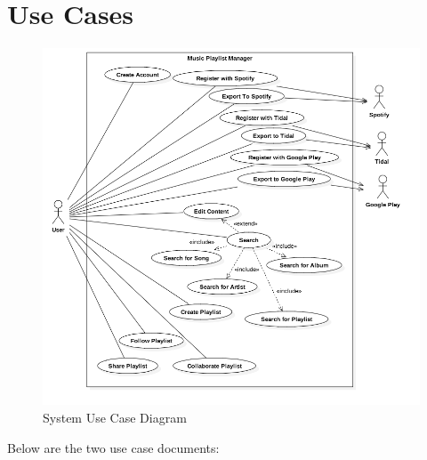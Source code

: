 \documentclass[12pt]{article}
\begin{document}
	\section{Use Cases}
	\begin{figure}[H]
		\centering
		\includegraphics[scale=0.4]{SystemUseCase}
		\caption{System Use Case Diagram}
		\label{fig:sucd}
	\end{figure}
	Below are the two use case documents:
	
\end{document}
